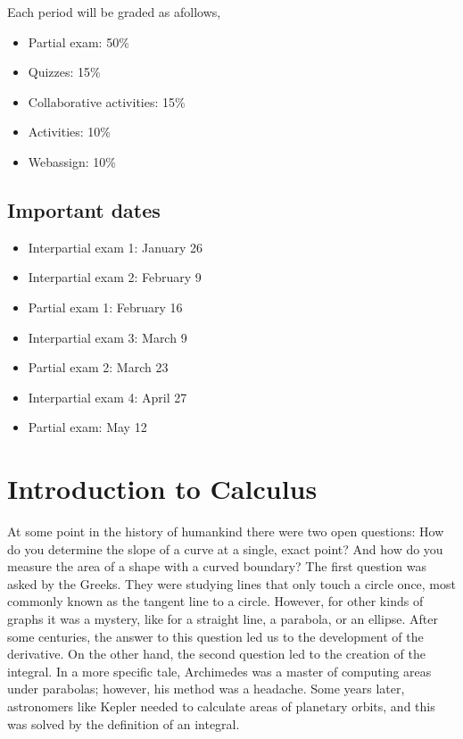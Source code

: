 \documentclass[../main-notes.tex]{subfile}
\begin{document}
Each period will be graded as afollows,
\begin{itemize}
    \item Partial exam: 50\%
    \item Quizzes: 15\%
    \item Collaborative activities: 15\%
    \item Activities: 10\%
    \item Webassign: 10\%
\end{itemize}

\subsection{Important dates}

\begin{itemize}
    \item Interpartial exam 1: January 26
    \item Interpartial exam 2: February 9
    \item Partial exam 1: February 16
    \item Interpartial exam 3: March 9
    \item Partial exam 2: March 23
    \item Interpartial exam 4: April 27
    \item Partial exam: May 12
\end{itemize}


\section{Introduction to Calculus}


At some point in the history of humankind there were two open questions: How do you determine the slope of a curve at a single, exact point? And how do you measure the area of a shape with a curved boundary?
The first question was asked by the Greeks.
They were studying lines that only touch a circle once, most commonly known as the tangent line to a circle.
However, for other kinds of graphs it was a mystery, like for a straight line, a parabola, or an ellipse.
After some centuries, the answer to this question led us to the development of the derivative.
On the other hand, the second question led to the creation of the integral.
In a more specific tale, Archimedes was a master of computing areas under parabolas; however, his method was a headache.
Some years later, astronomers like Kepler needed to calculate areas of planetary orbits, and this was solved by the definition of an integral.
\end{document}
